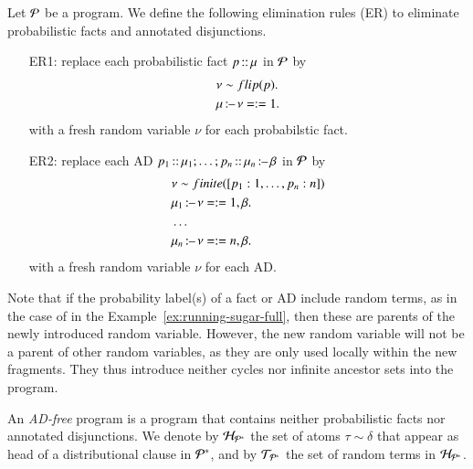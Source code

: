 \begin{definition}\label{def:elim-ad}
	Let ${\mathcal{P}}$ be  a \dcproblogsty program. We define the following elimination rules (ER) to eliminate probabilistic facts and annotated disjunctions.
	\begin{itemize}
		\item[ER1:] replace each probabilistic fact $p\operatorname*{\mathtt{{:}{:}}} \mu$ in ${\mathcal{P}}$ by
		      \begin{align*}
			       & \nu \sim flip(p).  \\
			       & \mu \operatorname*{\mathtt{{:}{\---}}} \nu=:=1.
		      \end{align*}
		      with a fresh random variable $\nu$ for each probabilstic fact.
		\item[ER2:] replace each AD $p_1\operatorname*{\mathtt{{:}{:}}}\mu_1;\dots;p_n \operatorname*{\mathtt{{:}{:}}} \mu_n \operatorname*{\mathtt{{:}{\---}}} \beta$ in ${\mathcal{P}}$ by
		      \begin{align*}
			       & \nu \sim finite([p_1 : 1, \dots, p_n : n]) \\
			       & \mu_1 \operatorname*{\mathtt{{:}{\---}}} \nu=:=1, \beta.                \\
			       & \dots                                      \\
			       & \mu_n \operatorname*{\mathtt{{:}{\---}}} \nu=:=n, \beta.
		      \end{align*}
		      with a fresh random variable $\nu$ for each AD.
	\end{itemize}
\end{definition}
Note that if the probability label(s) of a fact or AD include random terms, as in the case of  in the Example~\ref{ex:running-sugar-full},  then these are  parents of the newly introduced random variable. However, the new random variable will not be a parent of other random variables, as they are only used locally within the new fragments. They thus introduce neither cycles nor infinite ancestor sets into the program.


\begin{definition} \label{def:ad_free_program}
	An \emph{AD-free} \dcproblogsty program \adfreeprogram is a \dcproblogsty program that contains neither probabilistic facts nor annotated disjunctions. We denote by $\mathcal{H}_{{\mathcal{P}}^{*}}$ the set of atoms $\tau \sim \delta$ that appear as head of a distributional clause in ${{\mathcal{P}}^{*}}$, and by $\mathcal{T}_{{\mathcal{P}}^{*}}$ the set of random terms in $\mathcal{H}_{{\mathcal{P}}^{*}}$.
\end{definition}


